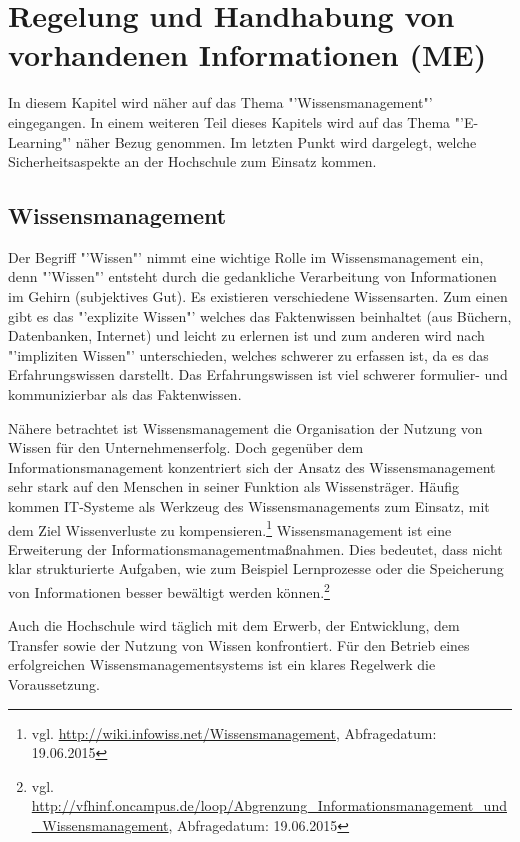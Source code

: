 \section{Regelung und Handhabung von vorhandenen Informationen (ME)}
In diesem Kapitel wird näher auf das Thema "'Wissensmanagement"' eingegangen. In einem weiteren Teil dieses Kapitels wird auf das Thema "'E-Learning"' näher Bezug genommen. Im letzten Punkt wird dargelegt, welche Sicherheitsaspekte an der Hochschule zum Einsatz kommen.

\subsection{Wissensmanagement}

Der Begriff "'Wissen"' nimmt eine wichtige Rolle im Wissensmanagement ein, denn "'Wissen"' entsteht durch die gedankliche Verarbeitung von Informationen im Gehirn (subjektives Gut). Es existieren verschiedene Wissensarten. Zum einen gibt es das "'explizite Wissen"' welches das Faktenwissen beinhaltet (aus Büchern, Datenbanken, Internet) und leicht zu erlernen ist und zum anderen wird nach "'impliziten Wissen"' unterschieden, welches schwerer zu erfassen ist, da es das Erfahrungswissen darstellt. Das Erfahrungswissen ist viel schwerer formulier- und kommunizierbar als das Faktenwissen. 

Nähere betrachtet ist Wissensmanagement die Organisation der Nutzung von Wissen für den Unternehmenserfolg. Doch gegenüber dem Informationsmanagement konzentriert sich der Ansatz des Wissensmanagement sehr stark auf den Menschen in seiner Funktion als Wissensträger. Häufig kommen IT-Systeme als Werkzeug des Wissensmanagements zum Einsatz, mit dem Ziel Wissenverluste zu kompensieren.\footnote{vgl. \url{http://wiki.infowiss.net/Wissensmanagement}, Abfragedatum: 19.06.2015}  Wissensmanagement ist eine Erweiterung der Informationsmanagementmaßnahmen. Dies bedeutet, dass nicht klar strukturierte Aufgaben, wie zum Beispiel Lernprozesse oder die Speicherung von Informationen besser bewältigt werden können.\footnote{vgl. \url{http://vfhinf.oncampus.de/loop/Abgrenzung_Informationsmanagement_und_Wissensmanagement}, Abfragedatum: 19.06.2015} 

Auch die Hochschule wird täglich mit dem Erwerb, der Entwicklung, dem Transfer sowie der Nutzung von Wissen konfrontiert. Für den Betrieb eines erfolgreichen Wissensmanagementsystems ist ein klares Regelwerk die Voraussetzung. 

